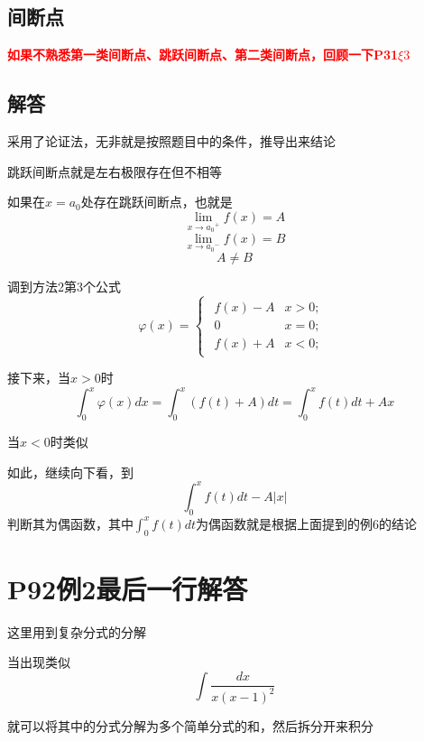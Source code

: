 \documentclass[a4paper]{ctexart}
\begin{document}
\begin{multicols}{2}
\subsection{间断点}
\textcolor{red}{\textbf{如果不熟悉第一类间断点、跳跃间断点、第二类间断点，回顾一下P31$\xi 3$}}

\subsection{解答}
\par 采用了论证法，无非就是按照题目中的条件，推导出来结论
\par 跳跃间断点就是左右极限存在但不相等
\par 如果在$x=a_0$处存在跳跃间断点，也就是
\begin{equation}
\lim_{x\rightarrow {a_0}^+}{f(x)} = A
\end{equation}
\begin{equation}
\lim_{x\rightarrow {a_0}^-}{f(x)} = B
\end{equation}
\begin{equation}
A \neq B
\end{equation}
\par 调到方法2第3个公式
\begin{equation}
\varphi(x) = 
\begin{cases}
    \begin{array}{ll}
    f(x) - A    &   x>0;\\
    0           &   x=0;\\
    f(x) + A    &   x<0;
    \end{array}
\end{cases}
\end{equation}
\par 接下来，当$x>0$时
\begin{equation}
\int_0^x{\varphi(x)dx} = \int_0^x{(f(t) + A)dt} = \int_0^x {f(t)dt} + Ax
\end{equation}
\par 当$x<0$时类似
\par 如此，继续向下看，到
\begin{equation}
\int_0^x{f(t)dt} - A \left| x \right|
\end{equation}
判断其为偶函数，其中$\int_0^x{f(t)dt}$为偶函数就是根据上面提到的例6的结论

\section{P92例2最后一行解答}
\par 这里用到复杂分式的分解
\par 当出现类似
$$ \int{
    \frac{dx}{
        x(x-1)^2
    }
}
$$
\par 就可以将其中的分式分解为多个简单分式的和，然后拆分开来积分


\end{multicols}
\end{document}
